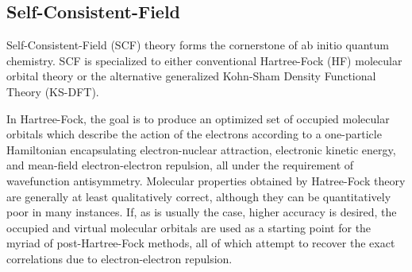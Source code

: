 \subsection{Self-Consistent-Field} \label{scf}

Self-Consistent-Field (SCF) theory forms the cornerstone of ab initio quantum
chemistry. SCF is specialized to either conventional Hartree-Fock (HF) molecular
orbital theory or the alternative generalized Kohn-Sham Density Functional
Theory (KS-DFT). 

In Hartree-Fock, the goal is to produce an optimized set of occupied molecular
orbitals which describe the action of the electrons according to a one-particle
Hamiltonian encapsulating electron-nuclear attraction, electronic kinetic
energy, and mean-field electron-electron repulsion, all under the requirement of
wavefunction antisymmetry. Molecular properties obtained by Hatree-Fock theory
are generally at least qualitatively correct, although they can be
quantitatively poor in many instances. If, as is usually the case, higher
accuracy is desired, the occupied and virtual molecular orbitals are used as a
starting point for the myriad of post-Hartree-Fock methods, all of which attempt
to recover the exact correlations due to electron-electron repulsion.  

